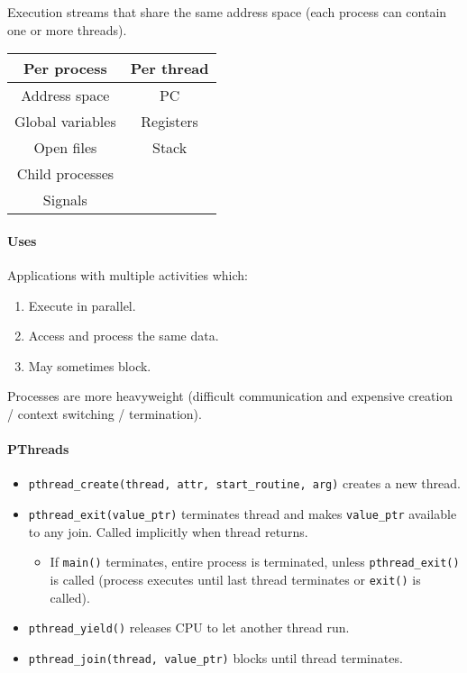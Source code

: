 \documentclass[twocolumn,english]{article}
\providecommand{\tabularnewline}{\\}
\providecommand{\tabularnewline}{\\}
\providecommand{\tabularnewline}{\\}
\begin{document}
Execution streams that share the same address space (each process
can contain one or more threads).

\begin{table}[H]
\centering{}%
\begin{tabular}{cc}
\toprule 
\textbf{Per process}  & \textbf{Per thread}\tabularnewline
\midrule 
Address space  & PC\tabularnewline
Global variables  & Registers\tabularnewline
Open files  & Stack\tabularnewline
Child processes  & \tabularnewline
Signals  & \tabularnewline
\bottomrule
\end{tabular}
\end{table}



\paragraph{Uses}

Applications with multiple activities which: 
\begin{enumerate}
\item Execute in parallel. 
\item Access and process the same data. 
\item May sometimes block. 
\end{enumerate}
Processes are more heavyweight (difficult communication and expensive
creation / context switching / termination).


\paragraph{PThreads}
\begin{itemize}
\item \texttt{pthread\_create(thread, attr, start\_routine, arg)} creates
a new thread. 
\item \texttt{pthread\_exit(value\_ptr)} terminates thread and makes \texttt{value\_ptr}
available to any join. Called implicitly when thread returns. 

\begin{itemize}
\item If \texttt{main()} terminates, entire process is terminated, unless
\texttt{pthread\_exit()} is called (process executes until last thread
terminates or \texttt{exit()} is called). 
\end{itemize}
\item \texttt{pthread\_yield()} releases CPU to let another thread run. 
\item \texttt{pthread\_join(thread, value\_ptr)} blocks until thread terminates. 
\end{itemize}
\end{document}

